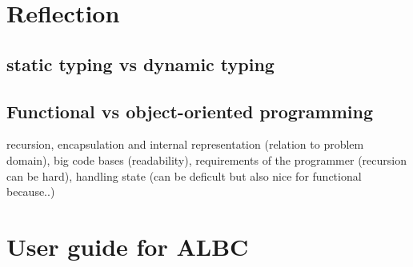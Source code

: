 \documentclass{IOS-Book-Article}
\begin{document}
\section{Reflection} \label{sec:reflection}
\subsection*{static typing vs dynamic typing}

\subsection*{Functional vs object-oriented programming}
recursion, encapsulation and internal representation (relation to problem domain), big code bases (readability), requirements of the programmer (recursion can be hard), handling state (can be deficult but also nice for functional because..)



\section{User guide for ALBC} \label{sec:userguide}


%




 


\end{document}
